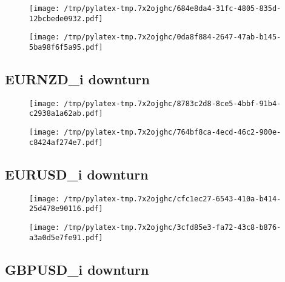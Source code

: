 \documentclass{article}%
\begin{document}
\begin{figure}[htbp]%
\centering%
\texttt{[image: /tmp/pylatex-tmp.7x2ojghc/684e8da4-31fc-4805-835d-12bcbede0932.pdf]}%
\end{figure}

%


\begin{figure}[htbp]%
\centering%
\texttt{[image: /tmp/pylatex-tmp.7x2ojghc/0da8f884-2647-47ab-b145-5ba98f6f5a95.pdf]}%
\end{figure}

%
\newpage %
\subsection{EURNZD\_i downturn}%
\label{subsec:EURNZDidownturn}%


\begin{figure}[htbp]%
\centering%
\texttt{[image: /tmp/pylatex-tmp.7x2ojghc/8783c2d8-8ce5-4bbf-91b4-c2938a1a62ab.pdf]}%
\end{figure}

%


\begin{figure}[htbp]%
\centering%
\texttt{[image: /tmp/pylatex-tmp.7x2ojghc/764bf8ca-4ecd-46c2-900e-c8424af274e7.pdf]}%
\end{figure}

%
\newpage %
\subsection{EURUSD\_i downturn}%
\label{subsec:EURUSDidownturn}%


\begin{figure}[htbp]%
\centering%
\texttt{[image: /tmp/pylatex-tmp.7x2ojghc/cfc1ec27-6543-410a-b414-25d478e90116.pdf]}%
\end{figure}

%


\begin{figure}[htbp]%
\centering%
\texttt{[image: /tmp/pylatex-tmp.7x2ojghc/3cfd85e3-fa72-43c8-b876-a3a0d5e7fe91.pdf]}%
\end{figure}

%
\newpage %
\subsection{GBPUSD\_i downturn}%
\label{subsec:GBPUSDidownturn}%
\end{document}
